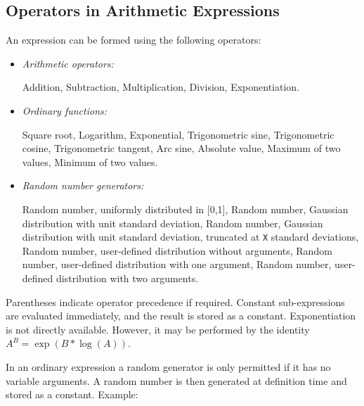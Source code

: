 \subsection{Operators in Arithmetic Expressions}
An expression can be formed using the following operators:
\begin{itemize}
\item {\em Arithmetic operators:}
\begin{mylist}
\ttitem{+}
Addition,
\ttitem{-}
Subtraction,
\ttitem{*}
Multiplication,
\ttitem{/}
Division,
\ttitem{\^\ }
Exponentiation.
\end{mylist}
\item {\em Ordinary functions:}
\begin{mylist}
Square root,
Logarithm,
Exponential,
Trigonometric sine,
Trigonometric cosine,
Trigonometric tangent,
Arc sine,
Absolute value,
Maximum of two values,
Minimum of two values.
\end{mylist}
\item {\em Random number generators:}
\begin{mylist}
Random number, uniformly distributed in [0,1],
Random number, Gaussian distribution with unit standard deviation,
Random number, Gaussian distribution with unit standard deviation,
truncated at {\tt X} standard deviations,
Random number, user-defined distribution without arguments,
Random number, user-defined distribution with one argument,
Random number, user-defined distribution with two arguments.
\end{mylist}
\end{itemize}
Parentheses indicate operator precedence if required.
Constant sub-expressions are evaluated immediately,
and the result is stored as a constant.
Exponentiation is not directly available.
However, it may be performed by the identity
\(A^{B}=\exp(B*\log(A))\).
 
In an ordinary expression a random generator
is only permitted if it has no variable arguments.
A random number is then generated at definition time
and stored as a constant.
Example:
 
